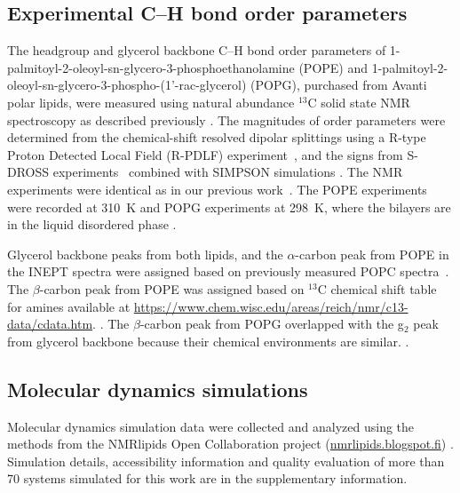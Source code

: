 \documentclass[aps,prl,superscriptaddress,twocolumn]{revtex4}
\begin{document}
\subsection{Experimental C--H bond order parameters}
The headgroup and glycerol backbone C--H bond order parameters of 1-palmitoyl-2-oleoyl-sn-glycero-3-phosphoethanolamine (POPE) and 1-palmitoyl-2-oleoyl-sn-glycero-3-phospho-(1'-rac-glycerol) (POPG), purchased from Avanti polar lipids, were measured using natural abundance $^{13}$C solid state NMR spectroscopy as described previously \cite{ferreira13,ferreira16}. The magnitudes of order parameters were determined from the chemical-shift resolved dipolar splittings using a R-type Proton Detected Local Field (R-PDLF) experiment~\cite{dvinskikh04}, and the signs from S-DROSS experiments~\cite{gross97} combined with SIMPSON simulations \cite{bak00}.
The NMR experiments were identical as in our previous work~\cite{antila19}. The POPE experiments were recorded at 310~K and POPG experiments at 298~K, where the bilayers are in the liquid disordered phase \cite{marsh13}.

Glycerol backbone peaks from both lipids, and the $\alpha$-carbon peak from POPE in the INEPT spectra 
were assigned based on previously measured POPC spectra~\cite{ferreira13}.
The $\beta$-carbon peak from POPE was assigned based on $^{13}$C chemical shift table for amines available
at \url{https://www.chem.wisc.edu/areas/reich/nmr/c13-data/cdata.htm}.
.
The $\beta$-carbon peak from POPG overlapped with the g$_2$ peak from glycerol backbone
because their chemical environments are similar.
.

\subsection{Molecular dynamics simulations}

Molecular dynamics simulation data were collected and analyzed using
the methods from the NMRlipids Open Collaboration project (\url{nmrlipids.blogspot.fi}) \cite{botan15,catte16,ollila16,antila19}.
Simulation details, accessibility information and quality evaluation of more than 70 systems simulated for this work are in the supplementary information.
\end{document}
